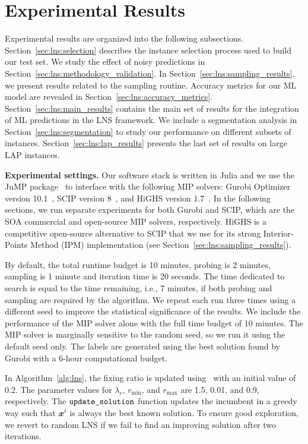 \documentclass[3p, authoryear, times]{elsarticle}
\begin{document}
\section{Experimental Results} \label{sec:lns:results}
Experimental results are organized into the following subsections. Section~\ref{sec:lns:selection} describes the instance selection process used to build our test set. We study the effect of noisy predictions in Section~\ref{sec:lns:methodology_validation}. In Section~\ref{sec:lns:sampling_results}, we present results related to the sampling routine. Accuracy metrics for our ML model are revealed in Section~\ref{sec:lns:accuracy_metrics}. Section~\ref{sec:lns:main_results} contains the main set of results for the integration of ML predictions in the LNS framework. We include a segmentation analysis in Section~\ref{sec:lns:segmentation} to study our performance on different subsets of instances. Section~\ref{sec:lns:lap_results} presents the last set of results on large LAP instances. 


\textbf{Experimental settings. }
Our software stack is written in Julia and we use the JuMP package~\citep{lubin_jump_2023} to interface with the following MIP solvers: Gurobi Optimizer version 10.1~\citep{gurobi}, SCIP version 8~\citep{bestuzheva_scip_2021}, and HiGHS version 1.7~\citep{huangfu_parallelizing_2018}. In the following sections, we run separate experiments for both Gurobi and SCIP, which are the SOA commercial and open-source MIP solvers, respectively. HiGHS is a competitive open-source alternative to SCIP that we use for its strong Interior-Points Method (IPM) implementation (see Section~\ref{sec:lns:sampling_results}). 

By default, the total runtime budget is 10 minutes, probing is 2 minutes, sampling is 1 minute and iteration time is 20 seconds. The time dedicated to search is equal to the time remaining, i.e., 7 minutes, if both probing and sampling are required by the algorithm. We repeat each run three times using a different seed to improve the statistical significance of the results. We include the performance of the MIP solver alone with the full time budget of 10 minutes. The MIP solver is marginally sensitive to the random seed, so we run it using the default seed only. The labels are generated using the best solution found by Gurobi with a 6-hour computational budget. 

In Algorithm~\ref{alg:lns}, the fixing ratio is updated using~ with an initial value of 0.2. The parameter values for $\lambda_r$, $r_{\text{min}}$, and $r_{\text{max}}$ are 1.5, 0.01, and 0.9, respectively.  The $\varname{update_solution}$ function updates the incumbent in a greedy way such that $\boldsymbol{x}'$ is always the best known solution. To ensure good exploration, we revert to random LNS if we fail to find an improving solution after two iterations. 
\end{document}

